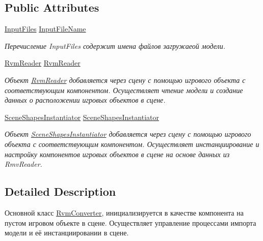 \subsection*{Public Attributes}
\begin{DoxyCompactItemize}
\item 
\mbox{\hyperlink{_input_files_8cs_afdf73d5dcfa18e5eaca6fa573fcf2590}{Input\+Files}} \mbox{\hyperlink{class_rvm_converter_a3411db3c1a04e63731d19e4253d32ac5}{Input\+File\+Name}}
\begin{DoxyCompactList}\small\item\em Перечисление Input\+Files содержит имена файлов загружаеой модели. \end{DoxyCompactList}\item 
\mbox{\hyperlink{class_rvm_reader}{Rvm\+Reader}} \mbox{\hyperlink{class_rvm_converter_ac6c385f8b740331cd879b3ef11686355}{Rvm\+Reader}}
\begin{DoxyCompactList}\small\item\em Объект \mbox{\hyperlink{class_rvm_reader}{Rvm\+Reader}} добавляется через сцену с помощью игрового объекта с соответствующим компонентом. Осуществляет чтение модели и создание данных о расположении игровых объектов в сцене. \end{DoxyCompactList}\item 
\mbox{\hyperlink{class_scene_shapes_instantiator}{Scene\+Shapes\+Instantiator}} \mbox{\hyperlink{class_rvm_converter_a88453bf28e3da9ffc41f40bb23460608}{Scene\+Shapes\+Instantiator}}
\begin{DoxyCompactList}\small\item\em Объект \mbox{\hyperlink{class_scene_shapes_instantiator}{Scene\+Shapes\+Instantiator}} добавляется через сцену с помощью игрового объекта с соответствующим компонентом. Осуществляет инстанциирование и настройку компонентов игровых объектов в сцене на основе данных из Rmv\+Reader. \end{DoxyCompactList}\end{DoxyCompactItemize}


\subsection{Detailed Description}
Основной класс \mbox{\hyperlink{class_rvm_converter}{Rvm\+Converter}}, инициализируется в качестве компонента на пустом игровом объекте в сцене. Осуществляет управление процессами импорта модели и её инстанциировании в сцене. 




